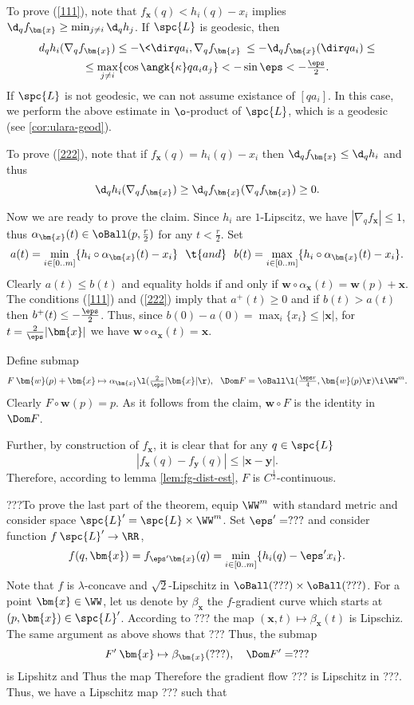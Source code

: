 To prove (\ref{111}), note that $f_{\bm{x}}(q)<h_i(q)-x_i$ implies $\d_qf_{\bm{x}}\ge\min_{j\not=i} \d_qh_j$.
If $\spc{L}$ is geodesic, then
\begin{multline*}
d_q{h_i}(\nabla_q f_{\bm{x}})
\le
-\<\dir q{a_i},\nabla_q f_{\bm{x}}\>
\le
-\d_qf_{\bm{x}}(\dir q{a_i})
\le
\\
\le
\max_{j\not=i}\{\cos\angk{\kappa}q{a_i}{a_j}\}
<
-\sin\eps<-\tfrac\eps2. 
\end{multline*}
If $\spc{L}$ is not geodesic, we can not assume existance of $[q{a_i}]$. 
In this case, we perform the above estimate in $\o$-product of $\spc{L}$, which is a geodesic (see \ref{cor:ulara-geod}).

To prove (\ref{222}), note that  if $f_{\bm{x}}(q)=h_i(q)-x_i$ then $\d_q f_{\bm{x}}\le \d_q h_i$ and thus
$$\d_q h_i(\nabla_q f_{\bm{x}})
\ge 
\d_qf_{\bm{x}}(\nabla_q f_{\bm{x}})\ge 0.$$


Now we are ready to prove the claim. 
Since $h_i$ are $1$-Lipscitz, we have $|\nabla_q f_{\bm{x}}|\le 1$, thus $\alpha_{\bm{x}}(t)\in \oBall(p,\tfrac r2)$ for any $t<\tfrac r2$.
Set 
$$a(t)=\min_{i\in[0..m]}\{h_i\circ\alpha_{\bm{x}}(t)-x_i\}
\ \ \t{and}\ \ 
b(t)=\max_{i\in[0..m]}\{h_i\circ\alpha_{\bm{x}}(t)-x_i\}.$$
Clearly $a(t)\le b(t)$ and equality holds if and only if 
${\bm{w}}\circ\alpha_{\bm{x}}(t)={\bm{w}}(p)+\bm{x}$.
The conditions (\ref{111}) and (\ref{222}) imply that $a^+(t)\ge 0$ and if $b(t)>a(t)$ then
$b^+(t)\le -\tfrac\eps2$. 
Thus, since $b(0)-a(0)=\max_i\{x_i\}\le |\bm{x}|$, for $t= \tfrac{2 }\eps|\bm{x}|$ we have ${\bm{w}}\circ\alpha_{\bm{x}}(t)=\bm{x}$.
\qeds

Define submap
$$F\:{\bm{w}}(p)+{\bm{x}}\mapsto \alpha_{\bm{x}}\l(\tfrac{2}\eps|\bm{x}|\r),\ \ 
\Dom F=\oBall\l(\tfrac{\eps r}{4} ,{\bm{w}}(p)\r)\i\WW^m.$$
Clearly $F\circ{\bm{w}}(p)=p$.
As it follows from the claim, 
${\bm{w}}\circ F$ is the identity in $\Dom F$.

Further, by construction of $f_{\bm{x}}$, it is clear that for any $q\in \spc{L}$
$$|f_{\bm{x}}(q)-f_{\bm{y}}(q)|\le |\bm{x}-\bm{y}|.$$
Therefore, according to lemma \ref{lem:fg-dist-est}, $F$ is $C^{\frac12}$-continuous.

\smallskip

???To prove the last part of the theorem, equip $\WW^m$ with standard metric and consider space $\spc{L}'=\spc{L}\times \WW^m$.
Set $\eps'=???$ and consider function $f\:\spc{L}'\to\RR$, 
$$f(q,\bm{x})=f_{\eps'\bm{x}}(q)=\min_{i\in[0..m]}\{h_i(q)-\eps' x_i\}.$$ 
Note that $f$ is $\lambda$-concave and $\sqrt{2}$-Lipschitz in $\oBall(???)\times \oBall(???)$.
For a point $\bm{x}\in\WW$, let us denote by $\beta_{\bm{x}}$ the $f$-gradient curve which starts at $(p,\bm{x})\in \spc{L}'$.
According to ??? the map $(\bm{x},t)\mapsto \beta_{\bm{x}}(t)$ is Lipschiz.
The same argument as above shows that ???
Thus, the submap 
$$F'\:\bm{x}\mapsto \beta_{\bm{x}}(???),\ \ \ \Dom F'=???$$
is Lipshitz and 
Thus the map
Therefore the gradient flow ??? is Lipschitz in ???.
Thus, we have a Lipschitz map ??? such that 
\qeds


